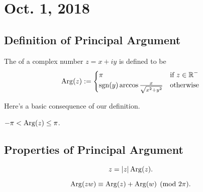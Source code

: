 \section{Oct. 1, 2018}

\subsection{Definition of Principal Argument}

\begin{definition}
    The  of a complex number 
    $z = x + iy$ is defined to be
    \[ {\operatorname{Arg}}(z) := \begin{cases}
    \pi & \text{if $z \in \operatorname{\mathbb{R}}^-$} \\
    {\operatorname{sgn}}(y) \arccos{\frac{x}{\sqrt{x^2+y^2}}} & \text{otherwise}
    \end{cases} \]
\end{definition}

Here's a basic consequence
of our definition.

\begin{theorem}
    $-\pi < {\operatorname{Arg}}(z) \le \pi$.
\end{theorem}

\subsection{Properties of Principal Argument}

\begin{theorem}
    \[ z = |z| \operatorname{Arg}(z). \] 
\end{theorem}

\begin{theorem}
    \[ \operatorname{Arg}(zw) \equiv \operatorname{Arg}(z) + \operatorname{Arg}(w) \pmod{2\pi}. \]
\end{theorem}



